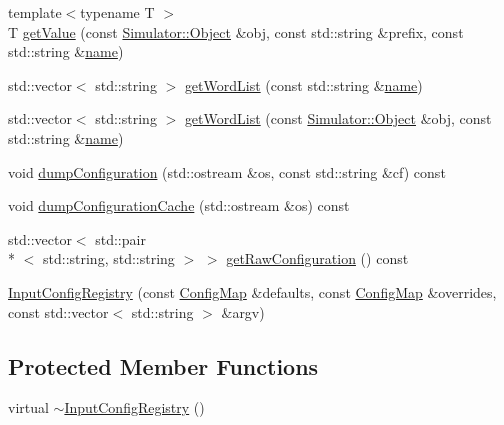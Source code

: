 \begin{DoxyCompactItemize}
\item 
{\footnotesize template$<$typename T $>$ }\\T \hyperlink{class_input_config_registry_a3aa63d5065221bf1555d0b577e80c597}{get\+Value} (const \hyperlink{class_simulator_1_1_object}{Simulator\+::\+Object} \&obj, const std\+::string \&prefix, const std\+::string \&\hyperlink{mtconf_8c_a8f8f80d37794cde9472343e4487ba3eb}{name})
\item 
std\+::vector$<$ std\+::string $>$ \hyperlink{class_input_config_registry_aa99ad5c19384c39a87c6819d1be3ca39}{get\+Word\+List} (const std\+::string \&\hyperlink{mtconf_8c_a8f8f80d37794cde9472343e4487ba3eb}{name})
\item 
std\+::vector$<$ std\+::string $>$ \hyperlink{class_input_config_registry_a0a75098d93d5fd18cbd87eed68b4b7e3}{get\+Word\+List} (const \hyperlink{class_simulator_1_1_object}{Simulator\+::\+Object} \&obj, const std\+::string \&\hyperlink{mtconf_8c_a8f8f80d37794cde9472343e4487ba3eb}{name})
\item 
void \hyperlink{class_input_config_registry_ae2e86533dd7a41f8adf30ff272f78a53}{dump\+Configuration} (std\+::ostream \&os, const std\+::string \&cf) const 
\item 
void \hyperlink{class_input_config_registry_ad2d5137210523e86e4ec8e058abcc188}{dump\+Configuration\+Cache} (std\+::ostream \&os) const 
\item 
std\+::vector$<$ std\+::pair\\*
$<$ std\+::string, std\+::string $>$ $>$ \hyperlink{class_input_config_registry_a1944632e46ddeb28dfc4af747370a208}{get\+Raw\+Configuration} () const 
\item 
\hyperlink{class_input_config_registry_a5a6a79ed3085963ee2dd8556c9e83a50}{Input\+Config\+Registry} (const \hyperlink{class_config_map}{Config\+Map} \&defaults, const \hyperlink{class_config_map}{Config\+Map} \&overrides, const std\+::vector$<$ std\+::string $>$ \&argv)
\end{DoxyCompactItemize}
\subsection*{Protected Member Functions}
\begin{DoxyCompactItemize}
\item 
virtual \hyperlink{class_input_config_registry_ab5165ca7cc7458d924d8a309de4d5c36}{$\sim$\+Input\+Config\+Registry} ()
\end{DoxyCompactItemize}


